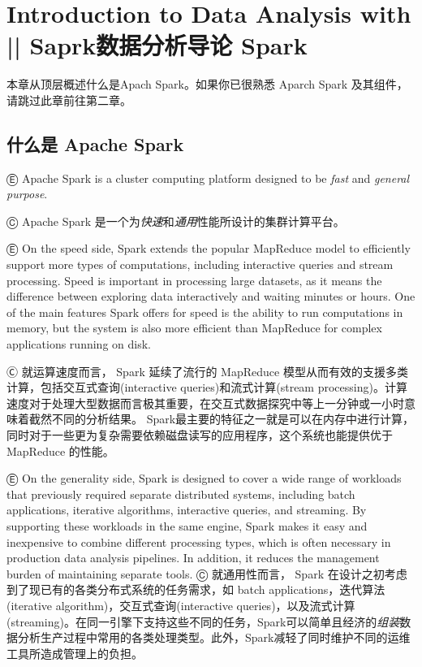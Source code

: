 



\chapter {Introduction to Data Analysis with  ||  Saprk数据分析导论
Spark}\label{spark_data_analysis_introduction}

本章从顶层概述什么是Apach Spark。如果你已很熟悉 Aparch Spark
及其组件，请跳过此章前往第二章。

\section{什么是 Apache Spark}\label{ux4ec0ux4e48ux662f-apache-spark}

Ⓔ Apache Spark is a cluster computing platform designed to be
\emph{fast} and \emph{general purpose}.

Ⓒ Apache Spark
是一个为\emph{快速}和\emph{通用}性能所设计的集群计算平台。

Ⓔ On the speed side, Spark extends the popular MapReduce model to efficiently support more types of computations, including interactive queries and stream processing. Speed is important in processing large datasets, as it means the difference between exploring data interactively and waiting minutes or hours. One of the main features Spark offers for speed is the ability to run computations in memory, but the system is also more efficient than MapReduce for complex applications running on disk.

Ⓒ 就运算速度而言， Spark 延续了流行的 MapReduce 模型从而有效的支援多类计算，包括交互式查询(interactive queries)和流式计算(stream processing)。计算速度对于处理大型数据而言极其重要，在交互式数据探究中等上一分钟或一小时意味着截然不同的分析结果。 Spark最主要的特征之一就是可以在内存中进行计算，同时对于一些更为复杂需要依赖磁盘读写的应用程序，这个系统也能提供优于
MapReduce 的性能。

Ⓔ On the generality side, Spark is designed to cover a wide range of
workloads that previously required separate distributed systems,
including batch applications, iterative algorithms, interactive queries,
and streaming. By supporting these workloads in the same engine, Spark
makes it easy and inexpensive to combine different processing types,
which is often necessary in production data analysis pipelines. In
addition, it reduces the management burden of maintaining separate
tools. Ⓒ 就通用性而言， Spark
在设计之初考虑到了现已有的各类分布式系统的任务需求，如 batch
applications，迭代算法(iterative algorithm)，交互式查询(interactive
queries)，以及流式计算(streaming)。在同一引擎下支持这些不同的任务，Spark可以简单且经济的\emph{组装}数据分析生产过程中常用的各类处理类型。此外，Spark减轻了同时维护不同的运维工具所造成管理上的负担。

